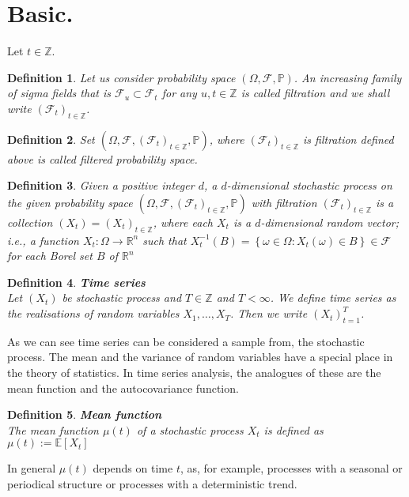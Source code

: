 \documentclass{book}
\newtheorem{definition}{Definition}[section]
\begin{document}
\section{Basic.}
Let $t\in \mathbb{Z}.$
\begin{definition}
Let us consider probability space $(\varOmega,\mathcal{F},\mathbb{P})$. 
An increasing family of sigma fields that is $\mathcal{F}_{u}\subset\mathcal{F}_{t}$ for any $u,t\in\mathbb{Z}$ is called filtration and we shall write $(\mathcal{F}_{t})_{t\in\mathbb{Z}}$. 
\end{definition}
\begin{definition}
Set $(\varOmega,\mathcal{F},(\mathcal{F}_{t})_{t\in\mathbb{Z}},\mathbb{P})$, where $(\mathcal{F}_{t})_{t\in\mathbb{Z}}$ is filtration defined above is called filtered probability space.
\end{definition}
\begin{definition}
Given a positive integer $d$, a $d$-dimensional stochastic process on the given probability space $(\varOmega,\mathcal{F},(\mathcal{F}_{t})_{t\in\mathbb{Z}},\mathbb{P})$ with filtration $(\mathcal{F}_{t})_{t\in\mathbb{Z}}$ is a collection $(X_{t})=(X_{t})_{t\in\mathbb{Z}}$, where each $X_{t}$ is a $d$-dimensional random vector; i.e., a function $X_{t}\colon\varOmega\to\mathbb{R}^{n}$ such that $X_{t}^{-1}(B)=\left\{\omega\in\varOmega\colon X_{t}(\omega)\in B\right\}\in\mathcal{F}$ for each Borel set $B$ of $\mathbb{R}^{n}$
\end{definition}
\begin{definition}\textbf{Time series}\\
Let $(X_{t})$ be stochastic process and $T\in \mathbb{Z}$ and $T<\infty$. We define time series as the realisations of random variables $X_{1},\dots,X_{T}$. Then we write $(X_{t})_{t=1}^{T}$.
\end{definition}
As we can see time series can be considered a sample from, the stochastic process.
The mean and the variance of random variables have a special place in the theory of statistics. In time series analysis, the analogues of these are the mean function and the autocovariance function.
\begin{definition}\textbf{Mean function}\\
The mean function $\mu(t)$ of a stochastic process $X_{t}$ is defined as
$\mu(t):=\mathbb{E}[X_{t}]$
\end{definition}
In general $\mu(t)$ depends on time $t$, as, for example, processes with a seasonal or periodical structure or processes with a deterministic trend.
\end{document}
